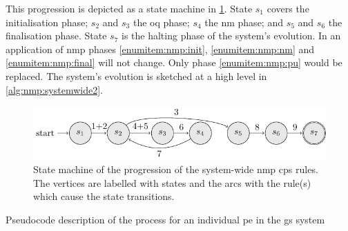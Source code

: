 This progression is depicted as a state machine in \cref{fig:nmp:systemwidestatemachine}.  State \(s_1\) covers the initialisation phase; \(s_2\) and \(s_3\) the \gls{oq} phase; \(s_4\) the \gls{nm} phase; and \(s_5\) and \(s_6\) the finalisation phase.  State \(s_7\) is the halting phase of the system's evolution.  In an application of \gls{nmp} phases \ref{enumitem:nmp:init}, \ref{enumitem:nmp:nm} and \ref{enumitem:nmp:final} will not change.  Only phase \ref{enumitem:nmp:pu} would be replaced.  The system's evolution is sketched at a high level in \cref{alg:nmp:systemwide2}.

\begin{figure}
    \centering
    \includegraphics{chapters/nmp/images/systemwidestatemachine.pdf}
    \caption[State machine of the progression of the system-wide  \gls{cps} rules.]{State machine of the progression of the system-wide \gls{nmp} \gls{cps} rules.  The vertices are labelled with states and the arcs with the rule(s) which cause the state transitions.}
    \label{fig:nmp:systemwidestatemachine}
\end{figure}

\begin{algorithm}
\DontPrintSemicolon
{}
\caption[Pseudocode of the  process in the \gls{gs} system]{\label{alg:nmp:systemwide2}Pseudocode description of the process for an individual \gls{pe} in the \gls{gs} system}
\end{algorithm}

